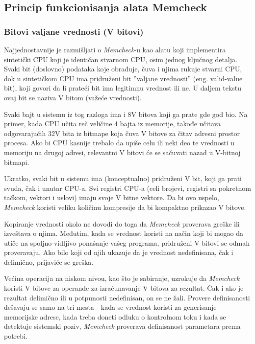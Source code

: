 \documentclass[12pt,oneside]{memoir}
\theoremstyle{plain}
\theoremstyle{definition}
\begin{document}
\subsection{Princip funkcionisanja alata Memcheck}

\subsubsection{Bitovi valjane vrednosti (V bitovi)}
Najjednostavnije je razmišljati o \textit{Memcheck}-u kao alatu koji implementira sintetički CPU koji je identičan stvarnom CPU, osim jednog ključnog detalja. Svaki bit (doslovno) podataka koje obrađuje, čuva i njima rukuje stvarni CPU, dok u sintetičkom CPU ima pridruženi bit ''valjane vrednosti'' (eng. valid-value bit), koji govori da li prateći bit ima legitimnu vrednost ili ne. U daljem tekstu ovaj bit se naziva V bitom (važeće vrednosti).

Svaki bajt u sistemu iz tog razloga ima i 8V bitova koji ga prate gde god bio. Na primer, kada CPU učita reč veličine 4 bajta iz memorije, takođe učitava odgovarajućih 32V bita iz bitmape koja čuva V bitove za čitav adresni prostor procesa. Ako bi CPU kasnije trebalo da upiše celu ili neki deo te vrednosti u memoriju na drugoj adresi, relevantni V bitovi će se sačuvati nazad u V-bitnoj bitmapi.

Ukratko, svaki bit u sistemu ima (konceptualno) pridruženi V bit, koji ga prati svuda, čak i unutar CPU-a. Svi registri CPU-a (celi brojevi, registri sa pokretnom tačkom, vektori i uslovi) imaju svoje V bitne vektore. Da bi ovo uspelo, \textit{Memcheck} koristi veliku količinu kompresije da bi kompaktno prikazao V bitove.

Kopiranje vrednosti okolo ne dovodi do toga da \textit{Memcheck} proverava greške ili izveštava o njima. Međutim, kada se vrednost koristi na način koji bi mogao da utiče na spoljno-vidljivo ponašanje vašeg programa, pridruženi V bitovi se odmah proveravaju. Ako bilo koji od njih ukazuje da je vrednost nedefinisana, čak i delimično, prijaviće se greška.

Većina operacija na niskom nivou, kao što je sabiranje, uzrokuje da \textit{Memcheck} koristi V bitove za operande za izračunavanje V bitova za rezultat. Čak i ako je rezultat delimično ili u potpunosti nedefinisan, on se ne žali. Provere definisanosti dešavaju se samo na tri mesta -  kada se vrednost koristi za generisanje memorijske adrese, kada treba doneti odluku o kontrolnom toku i kada se detektuje sistemski poziv, \textit{Memcheck} proverava definisanost parametara prema potrebi.
\end{document}
